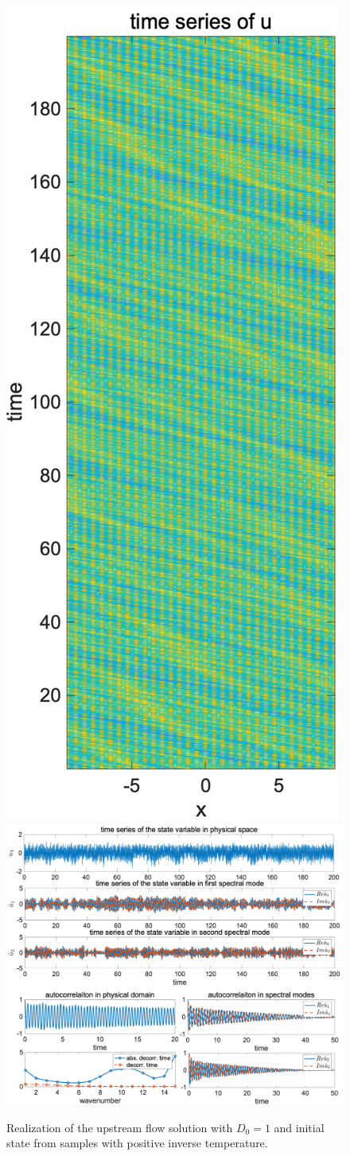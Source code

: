 \documentclass[9pt,twoside,lineno]{pnas-new}
\theoremstyle{plain}
\theoremstyle{plain}
\begin{document}
\begin{figure}[h]
\begin{centering}
\includegraphics[scale=0.35]{./snap2_J32L3D1E100}\includegraphics[scale=0.35]{./tseries3_J32L3D1E100}
\par\end{centering}
\caption{Realization of the upstream flow solution with $D_{0}=1$ and initial
state from samples with positive inverse temperature.\label{fig:Realization3}}
\end{figure}
\



\end{document}
